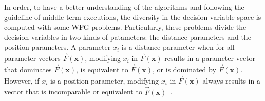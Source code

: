 \begin{figure}[t]
\centering

\label{fig:variable-decision-scalability-3obj}
\end{figure}


In order, to have a better understanding of the algorithms and following the guideline of middle-term executions, the diversity in the decision variable space is computed with some WFG problems.
%
Particularly, these problems divide the decision variables in two kinds of patameters: the distance parameters and the position parameters.
%
A parameter $x_i$ is a distance parameter when for all parameter vectors $\vec{F}(\mathbf{x})$, modifying $x_i$ in $\vec{F}(\mathbf{x})$ results in a parameter vector that dominates $\vec{F}(\mathbf{x})$, is equivalent to $\vec{F}(\mathbf{x})$, or is dominated by $\vec{F}(\mathbf{x})$.
%
However, if $x_i$ is a position parameter, modifying $x_i$ in $\vec{F}(\mathbf{x})$ always results in a vector that is incomparable or equivalent to $\vec{F}(\mathbf{x})$~\cite{huband2005scalable}.
%

